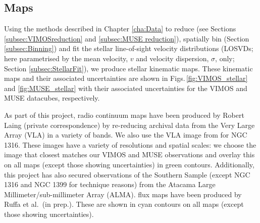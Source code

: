 	\subsection{Maps}
		\label{subsec:maps}
		Using the methods described in Chapter \ref{cha:Data} to reduce (see Sections \ref{subsec:VIMOSreduction} and \ref{subsec:MUSE reduction}), spatially bin (Section \ref{subsec:Binning}) and fit the stellar line-of-sight velocity distributions (LOSVDs; here parametrised by the mean velocity, $v$ and velocity dispersion, $\sigma$, only; Section \ref{subsec:StellarFit}), we produce stellar kinematic maps. These kinematic maps and their associated uncertainties are shown in Figs.\,\ref{fig:VIMOS_stellar} and \ref{fig:MUSE_stellar} with their associated uncertainties for the VIMOS and MUSE datacubes, respectively. 

		As part of this project, radio continuum maps have been produced by Robert Laing (private correspondence) by re-reducing archival data from the Very Large Array (VLA) in a variety of bands. We also use the VLA image from \citet{Lanz2010} for NGC 1316. These images have a variety of resolutions and spatial scales: we choose the image that closest matches our VIMOS and MUSE observations and overlay this on all maps (except those showing uncertainties) in green contours. Additionally, this project has also secured observations of the Southern Sample (except NGC 1316 and NGC 1399 for technique reasons) from the Atacama Large Millimeter/sub-millimeter Array (ALMA).  flux maps have been produced by Ruffa et al.\ (in prep.). These are shown in cyan contours on all maps (except those showing uncertainties). 



